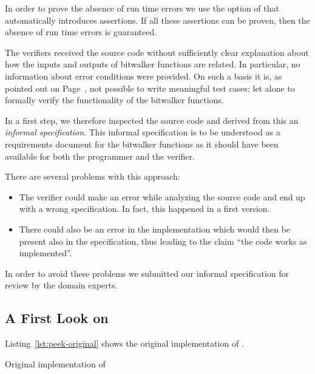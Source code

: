 In order to prove the absence of run time errors we use
the  option of \wpframac that automatically introduces \acsl
assertions. If all these assertions can be proven, then
the absence of run time errors is guaranteed.


\begin{framed}
The verifiers received the source code without sufficiently clear explanation
about how the inputs and outputs of bitwalker functions are related.
In particular, no information about error conditions were provided.
On such a basis it is, as pointed out on Page~\pageref{lesson},
not possible to write meaningful test cases;
let alone to formally verify the functionality of the bitwalker functions.

In a first step, we therefore inspected the source code and 
derived from this an \emph{informal specification}.
This informal specification is to be understood
as a requirements document for the bitwalker functions as it should have been
available for both the programmer and the verifier.

There are several problems with this approach:
\begin{itemize}
\item
The verifier could make an error while analyzing the source code
and end up with a wrong specification. 
In fact, this happened in a first version.

\item
There could also be an error in the implementation which would then be present also
in the specification, thus leading to the claim ``the code works as implemented''.
\end{itemize}

In order to avoid these problems we submitted our informal specification
for review by the domain experts.
\end{framed}

\clearpage

\subsection{A First Look on \peek}

Listing~\ref{lst:peek-original} shows the original implementation of \peek.


\begin{listing}[hbt]
\begin{minipage}{\textwidth}

\end{minipage}
\caption{\label{lst:peek-original} Original implementation of \peek}
\end{listing}


